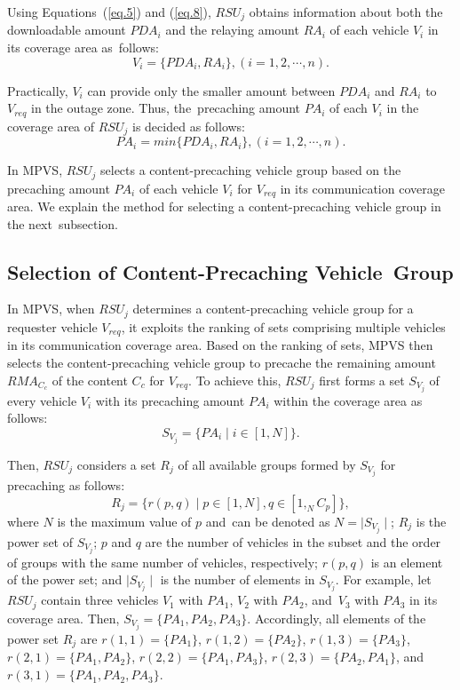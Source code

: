 \documentclass[sensors,aricle,accept,pdftex,moreauthors]{Definitions/mdpi}
\begin{document}
Using Equations~(\ref{eq.5}) and (\ref{eq.8}), $RSU_{j}$ obtains information about both the downloadable amount $PDA_{i}$ and the relaying amount $RA_{i}$ of each vehicle $V_{i}$ in its coverage area as~follows:
\begin{equation}
    V_{i}=\{PDA_{i}, RA_{i}\}, (i=1,2,\cdots,n).
\end{equation}

Practically, $V_{i}$ can provide only the smaller amount between $PDA_{i}$ and $RA_{i}$ to $V_{req}$ in the outage zone. 
Thus, the~precaching amount $PA_{i}$ of each $V_{i}$ in the coverage area of $RSU_{j}$ is decided as follows:
\begin{equation}
    PA_{i}=min\{PDA_{i}, RA_{i}\}, (i=1,2,\cdots,n).
\end{equation}

In MPVS, $RSU_{j}$ selects a content-precaching vehicle group based on the precaching amount $PA_{i}$ of each vehicle $V_{i}$ for $V_{req}$ in its communication coverage area.
We explain the method for selecting a content-precaching vehicle group in the next~subsection.


\subsection{Selection of Content-Precaching Vehicle~Group} \label{sec4.3}
In MPVS, when $RSU_{j}$ determines a content-precaching vehicle group for a requester vehicle $V_{req}$, it exploits the ranking of sets comprising multiple vehicles in its communication coverage area.
Based on the ranking of sets, MPVS then selects the content-precaching vehicle group to precache the remaining amount $RMA_{C_{c}}$ of the content ${C_{c}}$ for $V_{req}$.
To achieve this, $RSU_{j}$ first forms a set $S_{V_{j}}$ of every vehicle $V_{i}$ with its precaching amount $PA_{i}$ within the coverage area as follows:
\begin{equation}
    S_{V_{j}}=\{PA_{i}\mid i\in[1,N] \}.
\end{equation}

Then, $RSU_{j}$ considers a set $R_{j}$ of all available groups formed by $S_{V_{j}}$ for precaching as follows:
\begin{equation}
    R_{j}=\{r(p,q)\mid p\in[1,N],q\in[1,_{N}C_{p}] \},
\end{equation}
where $N$ is the maximum value of $p$ and~can be denoted as $N=\mid S_{V_{j}} \mid$; $R_{j}$ is the power set of $S_{V_{j}}$;
$p$ and $q$ are the number of vehicles in the subset and the order of groups with the same number of vehicles, respectively;
$r(p,q)$ is an element of the power set; and
$\mid S_{V_{j}} \mid$ is the number of elements in $S_{V_{j}}$.
For example, let $RSU_{j}$ contain three vehicles $V_{1}$ with $PA_{1}$, $V_{2}$ with $PA_{2}$, and~$V_{3}$ with $PA_{3}$ in its coverage area. 
Then, $S_{V_{j}}=\{PA_{1},PA_{2},PA_{3}\}$.
Accordingly, all elements of the power set $R_{j}$ are $r(1,1)=\{PA_{1}\}$, $r(1,2)=\{PA_{2}\}$, $r(1,3)=\{PA_{3}\}$, $r(2,1)=\{PA_{1}, PA_{2}\}$, $r(2,2)=\{PA_{1}, PA_{3}\}$, $r(2,3)=\{PA_{2}, PA_{1}\}$, and~$r(3,1)=\{PA_{1}, PA_{2}, PA_{3}\}$.
\end{document}
